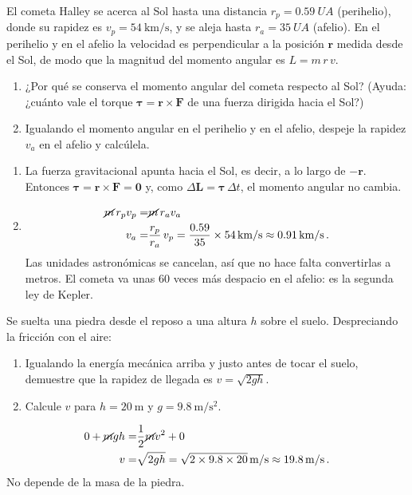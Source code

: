 \documentclass[12pt, a4paper]{article}
\begin{document}
\begin{exercise}[ID=cometa, tags={banco}]
El cometa Halley se acerca al Sol hasta una distancia $r_p=\qty{0.59}{UA}$ (perihelio), donde su rapidez es $v_p=\qty{54}{\km/\s}$, y se aleja hasta $r_a=\qty{35}{UA}$ (afelio). En el perihelio y en el afelio la velocidad es perpendicular a la posición $\boldsymbol{r}$ medida desde el Sol, de modo que la magnitud del momento angular es $L = m\,r\,v$.
\begin{enumerate}
    \item ¿Por qué se conserva el momento angular del cometa respecto al Sol? (Ayuda: ¿cuánto vale el torque $\boldsymbol{\tau}=\boldsymbol{r}\times\boldsymbol{F}$ de una fuerza dirigida hacia el Sol?)
    \item Igualando el momento angular en el perihelio y en el afelio, despeje la rapidez $v_a$ en el afelio y calcúlela.
\end{enumerate}
\end{exercise}
\begin{solution}
\begin{enumerate}
    \item La fuerza gravitacional apunta hacia el Sol, es decir, a lo largo de $-\boldsymbol{r}$. Entonces $\boldsymbol{\tau}=\boldsymbol{r}\times\boldsymbol{F}=\boldsymbol{0}$ y, como $\Delta\boldsymbol{L}=\boldsymbol{\tau}\,\Delta t$, el momento angular no cambia.
    \item
    \begin{align}
        \cancel{m}\, r_p v_p =& \cancel{m}\, r_a v_a\nonumber\\
        v_a =& \frac{r_p}{r_a}\,v_p = \frac{0.59}{35}\times\qty{54}{\km/\s} \approx \qty{0.91}{\km/\s}\,.
    \end{align}
    Las unidades astronómicas se cancelan, así que no hace falta convertirlas a metros. El cometa va unas 60 veces más despacio en el afelio: es la segunda ley de Kepler.
\end{enumerate}
\end{solution}

\begin{exercise}[ID=caida, tags={banco}]
Se suelta una piedra desde el reposo a una altura $h$ sobre el suelo. Despreciando la fricción con el aire:
\begin{enumerate}
    \item Igualando la energía mecánica arriba y justo antes de tocar el suelo, demuestre que la rapidez de llegada es $v=\sqrt{2gh}$.
    \item Calcule $v$ para $h=\qty{20}{\m}$ y $g=\qty{9.8}{\m/\s^2}$.
\end{enumerate}
\end{exercise}
\begin{solution}
\begin{align}
    0 + \cancel{m}gh =& \frac{1}{2}\cancel{m}v^2 + 0\nonumber\\
    v =& \sqrt{2gh} = \sqrt{2\times 9.8\times 20}\,\unit{\m/\s} \approx \qty{19.8}{\m/\s}\,.
\end{align}
No depende de la masa de la piedra.
\end{solution}
\end{document}
